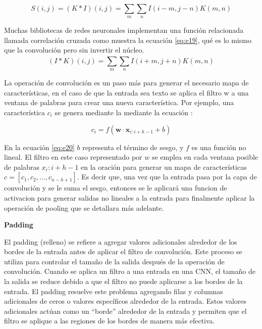 \begin{equation} \label{eq:e18} 
	S(i,j)=(K\ast I)(i,j)=\sum_{m}^{}\sum_{n}^{}I(i-m,j-n)K(m,n)
\end{equation}

Muchas bibliotecas de redes neuronales implementan una función relacionada llamada correlación cruzada como muestra la ecuación \ref{eq:e19}, qué es lo mismo que la convolución pero sin invertir el núcleo.
\begin{equation} \label{eq:e19} 
	(I\ast K)(i,j)=\sum_{m}^{}\sum_{n}^{}I(i+m,j+n)K(m,n)
\end{equation}


La operación de convolución es un paso más para generar el necesario mapa de características, en el caso de que la entrada sea texto se  aplica el filtro w a una ventana de palabras  para crear una nueva característica. Por ejemplo, una característica $c_i$ se genera mediante la mediante la ecuación :

\begin{equation} \label{eq:e20} 
	c_i = f(\mathbf{w}\cdot \mathbf{x}_{i:i+h-1} + b)
\end{equation}
 

	
En la ecuación \ref{eq:e20} $b$ representa el término de sesgo, y $f$ es una función no lineal. El filtro en este caso representado por $w$ se emplea en cada ventana posible de palabras $x_i:i+h-1$ en la oración para generar un mapa de características $c=[c_1,c_2,\ldots,c_{n-h+1}]$. Es decir que, una vez que la entrada pasa por la capa de convolución y se le suma el sesgo, entonces se le aplicará una funcion de activacion para generar salidas no lineales a la entrada para finalmente aplicar la operación de pooling que se detallara más adelante.

 \textbf{Padding}
 
 El padding (relleno) se refiere a agregar valores adicionales alrededor de los bordes de la entrada antes de aplicar el filtro de convolución. Este proceso se utiliza para controlar el tamaño de la salida después de la operación de convolución.
Cuando se aplica un filtro a una entrada en una CNN, el tamaño de la salida se reduce debido a que el filtro no puede aplicarse a los bordes de la entrada. El padding resuelve este problema agregando filas y columnas adicionales de ceros o valores específicos alrededor de la entrada. Estos valores adicionales actúan como un ``borde'' alrededor de la entrada y permiten que el filtro se aplique a las regiones de los bordes de manera más efectiva.

